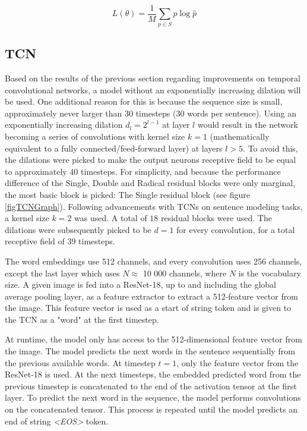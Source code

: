 \documentclass[a4paper, twoside]{article}
\begin{document}
\begin{equation}
L(\theta) = \frac{1}{M} \sum_{p \in S} p \log{\hat{p}}
\end{equation}

\subsection{TCN}
Based on the results of the previous section regarding improvements on temporal convolutional networks, a model without an exponentially increasing dilation will be used. One additional reason for this is because the sequence size is small, approximately never larger than 30 timesteps (30 words per sentence). Using an exponentially increasing dilation $d_l = 2^{l-1}$ at layer $l$ would result in the network becoming a series of convolutions with kernel size $k=1$ (mathematically equivalent to a fully connected/feed-forward layer) at layers $l>5$. To avoid this, the dilations were picked to make the output neurons receptive field to be equal to approximately 40 timesteps. For simplicity, and because the performance difference of the Single, Double and Radical residual blocks were only marginal, the most basic block is picked: The Single residual block (see figure \ref{figTCNGraph}). 
Following \cite{tcn} advancements with TCNs on sentence modeling tasks, a kernel size $k=2$ was used. A total of $18$ residual blocks were used. The dilations were subsequently picked to be $d=1$ for every convolution, for a total receptive field of $39$ timesteps.

The word embeddings use 512 channels, and every convolution uses 256 channels, except the last layer which uses $N \approx $ 10 000 channels, where $N$ is the vocabulary size. A given image is fed into a ResNet-18, up to and including the global average pooling layer, as a feature extractor to extract a 512-feature vector from the image. This feature vector is used as a start of string token and is given to the TCN as a "word" at the first timestep.

At runtime, the model only has access to the 512-dimensional feature vector from the image. The model predicts the next words in the sentence sequentially from the previous available words. At timestep $t=1$, only the feature vector from the ResNet-18 is used. At the next timesteps, the embedded predicted word from the previous timestep is concatenated to the end of the activation tensor at the first layer. To predict the next word in the sequence, the model performs convolutions on the concatenated tensor. This process is repeated until the model predicts an end of string \textit{<EOS>} token.
\end{document}
